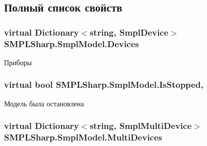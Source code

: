 \subsection{Полный список свойств}
\hypertarget{class_s_m_p_l_sharp_1_1_smpl_model_af79bc37f93c34d07abbdf36028581640}{
\subsubsection[{Devices}]{\setlength{\rightskip}{0pt plus 5cm}virtual Dictionary$<$string, {\bf Smpl\-Device}$>$ S\-M\-P\-L\-Sharp.\-Smpl\-Model.\-Devices\hspace{0.3cm}{\ttfamily [get]}}}\label{df/d34/class_s_m_p_l_sharp_1_1_smpl_model_af79bc37f93c34d07abbdf36028581640}


Приборы 

\hypertarget{class_s_m_p_l_sharp_1_1_smpl_model_a5427e31d8b72ff5823518e5eff801fd3}{
\subsubsection[{Is\-Stopped}]{\setlength{\rightskip}{0pt plus 5cm}virtual bool S\-M\-P\-L\-Sharp.\-Smpl\-Model.\-Is\-Stopped\hspace{0.3cm}{\ttfamily [get]}, {\ttfamily [set]}}}\label{df/d34/class_s_m_p_l_sharp_1_1_smpl_model_a5427e31d8b72ff5823518e5eff801fd3}


Модель была остановлена 

\hypertarget{class_s_m_p_l_sharp_1_1_smpl_model_a6a37ccf8af439fc11b156eff04514e2e}{
\subsubsection[{Multi\-Devices}]{\setlength{\rightskip}{0pt plus 5cm}virtual Dictionary$<$string, {\bf Smpl\-Multi\-Device}$>$ S\-M\-P\-L\-Sharp.\-Smpl\-Model.\-Multi\-Devices\hspace{0.3cm}{\ttfamily [get]}}}\label{df/d34/class_s_m_p_l_sharp_1_1_smpl_model_a6a37ccf8af439fc11b156eff04514e2e}



